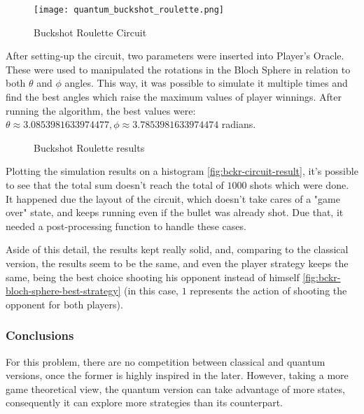 \documentclass{article}
\begin{document}
\begin{figure}[h]
	\centering
	\texttt{[image: quantum\_buckshot\_roulette.png]}
	\caption{Buckshot Roulette Circuit}
	\label{fig:bckr-circuit}
\end{figure}

After setting-up the circuit, two parameters were inserted into Player's Oracle. These were used to manipulated the rotations in the Bloch Sphere in relation to both $\theta$ and $\phi$ angles. This way, it was possible to simulate it multiple times and find the best angles which raise the maximum values of player winnings. After running the algorithm, the best values were: $\theta\approx 3.0853981633974477, \phi\approx3.7853981633974474$ radians.

\newpage


\begin{figure}[h]
	\centering
	\caption{Buckshot Roulette results}
	\label{fig:buckshot-results}
\end{figure}

Plotting the simulation results on a histogram \ref{fig:bckr-circuit-result}, it's possible to see that the total sum doesn't reach the total of $1000$ shots which were done. It happened due the layout of the circuit, which doesn't take cares of a "game over" state, and keeps running even if the bullet was already shot. Due that, it needed a post-processing function to handle these cases.

Aside of this detail, the results kept really solid, and, comparing to the classical version, the results seem to be the same, and even the player strategy keeps the same, being the best choice shooting his opponent instead of himself \ref{fig:bckr-bloch-sphere-best-strategy} (in this case, $1$ represents the action of shooting the opponent for both players).

\subsubsection{Conclusions}

For this problem, there are no competition between classical and quantum versions, once the former is highly inspired in the later. However, taking a more game theoretical view, the quantum version can take advantage of more states, consequently it can explore more strategies than its counterpart.
\end{document}
